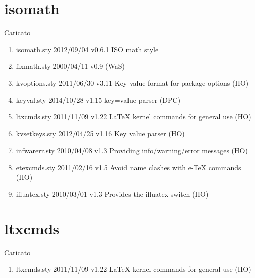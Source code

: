 \section{isomath}	 	 

Caricato 
\begin{enumerate}
\item isomath.sty 2012/09/04 v0.6.1 ISO math style
\item fixmath.sty 2000/04/11 v0.9 (WaS)
\item kvoptions.sty 2011/06/30 v3.11 Key value format for package options (HO)
\item keyval.sty 2014/10/28 v1.15 key=value parser (DPC)
\item ltxcmds.sty 2011/11/09 v1.22 LaTeX kernel commands for general use (HO)
\item kvsetkeys.sty 2012/04/25 v1.16 Key value parser (HO)
\item infwarerr.sty 2010/04/08 v1.3 Providing info/warning/error messages (HO)
\item etexcmds.sty 2011/02/16 v1.5 Avoid name clashes with e-TeX commands (HO)
\item ifluatex.sty 2010/03/01 v1.3 Provides the ifluatex switch (HO)
\end{enumerate}	
\section{ltxcmds}	 	 

Caricato 
\begin{enumerate}
\item ltxcmds.sty 2011/11/09 v1.22 LaTeX kernel commands for general use (HO)
\end{enumerate}
